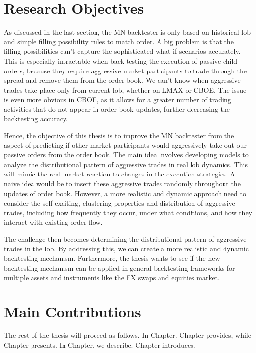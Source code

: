 \section{Research Objectives}
As discussed in the last section, the MN backtester is only based on historical \gls{lob} and simple filling possibility rules to match order. A big problem is that the filling possibilities can't capture the sophisticated what-if scenarios accurately. This is especially intractable when back testing the execution of passive child orders, because they require aggressive market participants to trade through the spread and remove them from the order book. We can't know when aggressive trades take place only from current \gls{lob}, whether on LMAX or CBOE. The issue is even more obvious in CBOE, as it allows for a greater number of trading activities that do not appear in order book updates, further decreasing the backtesting accuracy. 

Hence, the objective of this thesis is to improve the MN backtester from the aspect of predicting if other market participants would aggressively take out our passive orders from the order book. The main idea involves developing models to analyze the distributional pattern of aggressive trades in real \gls{lob} dynamics. This will mimic the real market reaction to changes in the execution strategies. A naive idea would be to insert these aggressive trades randomly throughout the updates of order book. However, a more realistic and dynamic approach need to consider the self-exciting, clustering properties and distribution of aggressive trades, including how frequently they occur, under what conditions, and how they interact with existing order flow.

The challenge then becomes determining the distributional pattern of aggressive trades in the \gls{lob}. By addressing this, we can create a more realistic and dynamic backtesting mechanism. Furthermore, the thesis wants to see if the new backtesting mechanism can be applied in general backtesting frameworks for multiple assets and instruments like the FX swaps and equities market.



\section{Main Contributions}

The rest of the thesis will proceed as follows. In Chapter. Chapter provides, while Chapter presents. In Chapter, we describe. Chapter introduces.